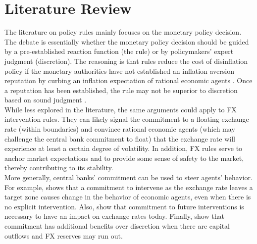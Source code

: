 \documentclass[11pt]{article}
\begin{document}
\section{Literature Review}
\label{sec:literature}

The literature on policy rules mainly focuses on the monetary policy decision.
The  debate is  essentially whether  the  monetary policy  decision should  be
guided by a  pre-established reaction function (the rule)  or by policymakers’
expert judgment (discretion).  The reasoning is that rules reduce  the cost of
disinflation  policy  if the  monetary  authorities  have not  established  an
inflation aversion reputation by curbing  an inflation expectation of rational
economic agents \citep{kydland1977}.  Once  a reputation has been established,
the  rule  may  not  be  superior   to  discretion  based  on  sound  judgment
\citep{barro1983}.\\

While less  explored in the literature,  the same arguments could  apply to FX
intervention  rules. They  can  likely  signal the  commitment  to a  floating
exchange rate (within boundaries) and convince rational economic agents (which
may challenge  the central bank  commitment to  float) that the  exchange rate
will experience at least a certain degree of volatility. In addition, FX rules
serve to anchor market expectations \citep{montoro2013} and  to provide
some sense of safety to the market, thereby contributing to its stability.\\

More  generally,  central banks’  commitment  can  be  used to  steer  agents’
behavior. For example, \cite{krugman1991} shows that a commitment to intervene
as the  exchange rate leaves  a target zone causes  change in the  behavior of
economic  agents,  even  when  there   is  no  explicit  intervention.   Also,
\cite{fanelli2020} show  that commitment to future  interventions is necessary
to have an impact on exchange rates today.  Finally, \cite{basu2018} show that
commitment  has additional  benefits over  discretion when  there are  capital
outflows and FX reserves may run out.\\
\end{document}
